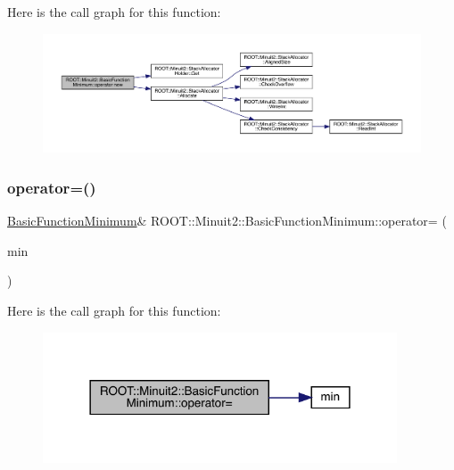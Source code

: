 Here is the call graph for this function\+:
\nopagebreak
\begin{figure}[H]
\begin{center}
\leavevmode
\includegraphics[width=350pt]{de/d25/classROOT_1_1Minuit2_1_1BasicFunctionMinimum_a49a32bdb3ff21202fcfa9a9e42015b8f_cgraph}
\end{center}
\end{figure}
\mbox{\label{classROOT_1_1Minuit2_1_1BasicFunctionMinimum_ad143c1c314e041649151bac9bb9e7a91}} 
\subsubsection{\texorpdfstring{operator=()}{operator=()}\hspace{0.1cm}{\footnotesize\ttfamily [1/2]}}
{\footnotesize\ttfamily \mbox{\hyperlink{classROOT_1_1Minuit2_1_1BasicFunctionMinimum}{Basic\+Function\+Minimum}}\& R\+O\+O\+T\+::\+Minuit2\+::\+Basic\+Function\+Minimum\+::operator= (\begin{DoxyParamCaption}\item[{const \mbox{\hyperlink{classROOT_1_1Minuit2_1_1BasicFunctionMinimum}{Basic\+Function\+Minimum}} \&}]{min }\end{DoxyParamCaption})\hspace{0.3cm}{\ttfamily [inline]}}

Here is the call graph for this function\+:
\nopagebreak
\begin{figure}[H]
\begin{center}
\leavevmode
\includegraphics[width=298pt]{de/d25/classROOT_1_1Minuit2_1_1BasicFunctionMinimum_ad143c1c314e041649151bac9bb9e7a91_cgraph}
\end{center}
\end{figure}
\mbox{\label{classROOT_1_1Minuit2_1_1BasicFunctionMinimum_ad143c1c314e041649151bac9bb9e7a91}} 
